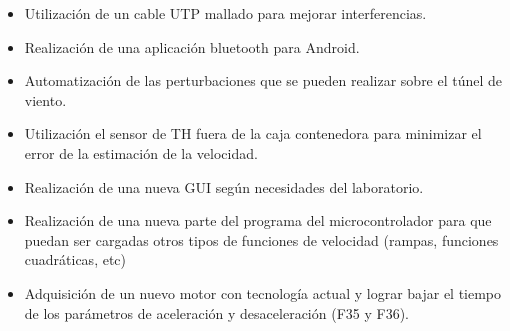 \begin{itemize}
	\item Utilización de un cable UTP mallado para mejorar interferencias.
\item Realización de una aplicación bluetooth para Android.
\item Automatización de las perturbaciones que se pueden realizar sobre el túnel de viento.
\item Utilización el sensor de TH fuera de la caja contenedora para minimizar  el error de la estimación de la velocidad.
\item Realización de una nueva GUI según necesidades del laboratorio.
\item Realización de una nueva parte del programa del microcontrolador para que puedan ser cargadas otros tipos de funciones de velocidad (rampas, funciones cuadráticas, etc)
\item Adquisición de un nuevo motor con tecnología actual y lograr bajar el tiempo de los parámetros de aceleración y desaceleración (F35 y F36).
\end{itemize}